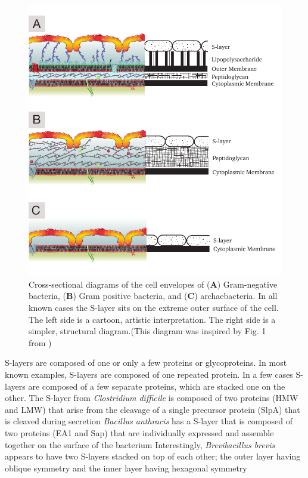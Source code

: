 \begin{figure}[htb] %
  \begin{center}
    \includegraphics{intro/img/celwalls.pdf}
  \end{center}
  \caption[Cross-sectional diagrams of \ac{S-layer} containing cell envelopes]{Cross-sectional diagrams of the cell envelopes of (\textbf{A}) Gram-negative bacteria, (\textbf{B})
Gram positive bacteria, and (\textbf{C}) archaebacteria. In all known cases the \ac{S-layer} sits on the extreme outer surface of the cell. The left side is a cartoon, artistic
interpretation. The right side is a simpler, structural diagram.(This diagram was inspired by Fig. 1 from )}
  \label{fig:cellwalls}
\end{figure}

\Acp{S-layer} are composed of one or only a few proteins or glycoproteins. In most known examples, \acp{S-layer} are composed of one repeated protein. In a few cases \acp{S-layer}
are composed of a few separate proteins, which are stacked one on the other. The \ac{S-layer} from \textit{Clostridium difficile} is composed of two proteins (HMW and LMW) that
arise from the cleavage of a single precursor protein (SlpA) that is cleaved during secretion \textit{Bacillus anthracis} has a
\ac{S-layer} that is composed of two proteins (EA1 and Sap) that are individually expressed and assemble together on the surface of the bacterium
Interestingly, \textit{Brevibacillus brevis} appears to have two \acp{S-layer} stacked on top of each other; the outer layer having oblique symmetry and the inner layer having
hexagonal symmetry
    
